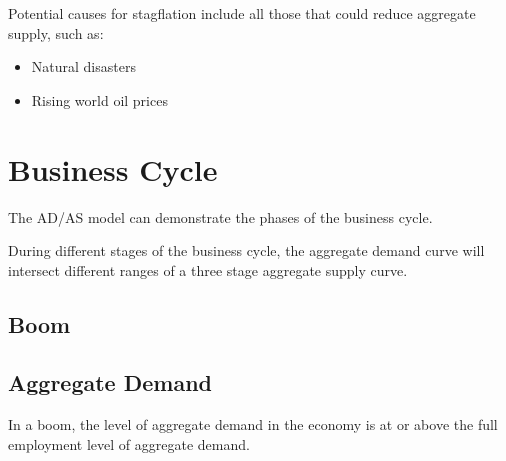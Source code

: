 \documentclass[a4paper,11pt]{article}
\begin{document}
Potential causes for stagflation include all those that could reduce aggregate
supply, such as:

\begin{itemize}
\item Natural disasters
\item Rising world oil prices
\end{itemize}




\section{Business Cycle}

The AD/AS model can demonstrate the phases of the business cycle.

During different stages of the business cycle, the aggregate demand curve will
intersect different ranges of a three stage aggregate supply curve.


\subsection{Boom}




\subsection{Aggregate Demand}

In a boom, the level of aggregate demand in the economy is at or above the full
employment level of aggregate demand.
\end{document}
